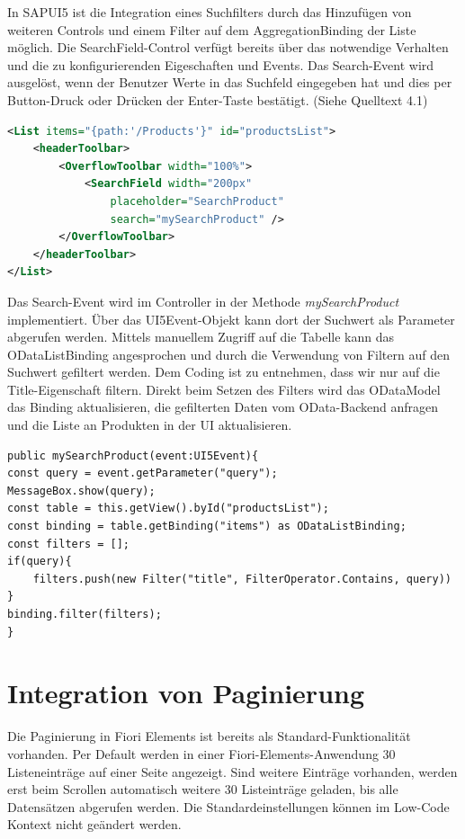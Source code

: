 In SAPUI5 ist die Integration eines Suchfilters durch das Hinzufügen von weiteren Controls und einem Filter auf dem AggregationBinding der Liste möglich. Die SearchField-Control verfügt bereits über das notwendige Verhalten und die zu konfigurierenden Eigeschaften und Events. Das Search-Event wird ausgelöst, wenn der Benutzer Werte in das Suchfeld eingegeben hat und dies per Button-Druck oder Drücken der Enter-Taste bestätigt. (Siehe Quelltext 4.1) 
\begin{lstlisting}[language=XML,  caption=Implementierung von Suchfilter in der \texttt{Main.view.xml}]
<List items="{path:'/Products'}" id="productsList">
	<headerToolbar>
		<OverflowToolbar width="100%">
			<SearchField width="200px" 
				placeholder="SearchProduct" 
				search="mySearchProduct" />
		</OverflowToolbar>
	</headerToolbar>
</List>
\end{lstlisting}

Das Search-Event wird im Controller in der Methode \textit{mySearchProduct} implementiert. Über das UI5Event-Objekt kann dort der Suchwert als Parameter abgerufen werden. Mittels manuellem Zugriff auf die Tabelle kann das ODataListBinding angesprochen und durch die Verwendung von Filtern auf den Suchwert gefiltert werden. Dem Coding ist zu entnehmen, dass wir nur auf die Title-Eigenschaft filtern. Direkt beim Setzen des Filters wird das ODataModel das Binding aktualisieren, die gefilterten Daten vom OData-Backend anfragen und die Liste an Produkten in der UI aktualisieren.
 
\begin{lstlisting}[emph={event, UI5Event, query, productsList, items, table, binding, filters},  caption=Implementation von Suchfilter in der \texttt{Main.controller.ts}]
public mySearchProduct(event:UI5Event){
const query = event.getParameter("query");
MessageBox.show(query);
const table = this.getView().byId("productsList");
const binding = table.getBinding("items") as ODataListBinding;
const filters = [];
if(query){
	filters.push(new Filter("title", FilterOperator.Contains, query))
}
binding.filter(filters);
}
\end{lstlisting}

\section{Integration von Paginierung}

Die Paginierung in Fiori Elements ist bereits als Standard-Funktionalität vorhanden. Per Default werden in einer Fiori-Elements-Anwendung 30 Listeneinträge auf einer Seite angezeigt. Sind weitere Einträge vorhanden, werden erst beim Scrollen automatisch weitere 30 Listeinträge geladen, bis alle Datensätzen abgerufen werden. Die Standardeinstellungen können im Low-Code Kontext nicht geändert werden.

